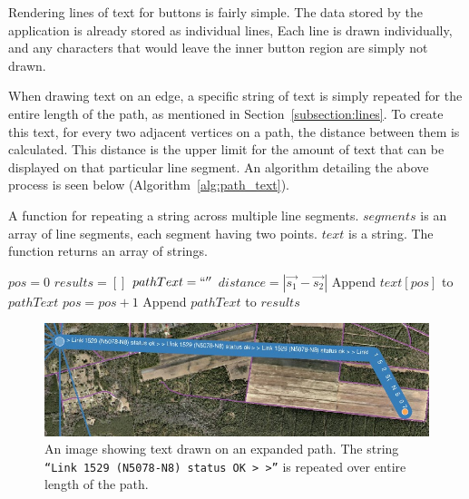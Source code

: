 Rendering lines of text for buttons is fairly simple. The data stored by the application is 
already stored as individual lines, Each line is drawn individually, and any characters that 
would leave the inner button region are simply not drawn.

When drawing text on an edge, a specific string of text is simply repeated for the entire length of the path, as mentioned in Section~\ref{subsection:lines}. To create this text, for every two adjacent vertices on a path, the distance between them is calculated. This distance is the upper limit for the amount of text that can be displayed on that particular line segment. An algorithm detailing the above process is seen below (Algorithm~\ref{alg:path_text}).

\begin{algorithm}
    \caption{A function for repeating a string across multiple line segments. $segments$ is an array of
    line segments, each segment having two points. $text$ is a string. The function returns an array of
    strings.}
    \label{alg:path_text}
    \begin{algorithmic}[1]
            \State $pos = 0$
            \State $results = []$
                \State $pathText = ``''$
                \State $distance = |\vec{s_1} - \vec{s_2}|$
                    \State Append $text[pos]$ to $pathText$
                    \State $pos = pos + 1$
                \EndWhile
                \State Append $pathText$ to $results$
            \EndFor 
            \State {}
        \EndFunction
    \end{algorithmic}
\end{algorithm}

\begin{figure}[htp] \centering
    \includegraphics[width=0.8\linewidth]{img/text_path.jpg}
    \caption[Text Drawn on a Path]{An image showing text drawn on an expanded path. The string {\tt ``Link 1529 (N5078-N8) status OK > >''} is repeated over entire length of the path.}
    \label{fig:text_path}
\end{figure}

